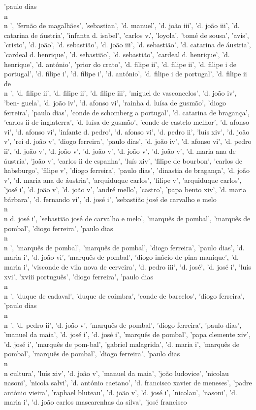 \documentclass{article}
\begin{document}
\begin{itemize}
'paulo dias\\n\\n ', 'fernão de magalhães', 'sebastian', 'd. manuel', 'd. joão iii', 'd. joão iii', 'd. catarina de áustria', 'infanta d. isabel', 'carlos v.', 'loyola', 'tomé de sousa', 'avis', 'cristo', 'd. joão', 'd. sebastião', 'd. joão iii', 'd. sebastião', 'd. catarina de áustria', 'cardeal d. henrique', 'd. sebastião', 'd. sebastião', 'cardeal d. henrique', 'd. henrique', 'd. antónio', 'prior do crato', 'd. filipe ii', 'd. filipe ii', 'd. filipe i de portugal', 'd. filipe i', 'd. filipe i', 'd. antónio', 'd. filipe i de portugal', 'd. filipe ii de\\n ', 'd. filipe ii', 'd. filipe ii', 'd. filipe iii', 'miguel de vasconcelos', 'd. joão iv', 'ben- guela', 'd. joão iv', 'd. afonso vi', 'rainha d. luísa de gusmão', 'diogo ferreira', 'paulo dias', 'conde de schomberg a portugal', 'd. catarina de bragança', 'carlos ii de inglaterra', 'd. luísa de gusmão', 'conde de castelo melhor', 'd. afonso vi', 'd. afonso vi', 'infante d. pedro', 'd. afonso vi', 'd. pedro ii', 'luís xiv', 'd. joão v', 'rei d. joão v', 'diogo ferreira', 'paulo dias', 'd. joão iv', 'd. afonso vi', 'd. pedro ii', 'd. joão v', 'd. joão v', 'd. joão v', 'd. joão v', 'd. joão v', 'd. maria ana de áustria', 'joão v', 'carlos ii de espanha', 'luís xiv', 'filipe de bourbon', 'carlos de habsburgo', 'filipe v', 'diogo ferreira', 'paulo dias', 'dinastia de bragança', 'd. joão v', 'd. maria ana de áustria', 'arquiduque carlos', 'filipe v', 'arquiduque carlos', 'josé i', 'd. joão v', 'd. joão v', 'andré mello', 'castro', 'papa bento xiv', 'd. maria bárbara', 'd. fernando vi', 'd. josé i', 'sebastião josé de carvalho e melo\\n\\n d. josé i', 'sebastião josé de carvalho e melo', 'marquês de pombal', 'marquês de pombal', 'diogo ferreira', 'paulo dias\\n\\n ', 'marquês de pombal', 'marquês de pombal', 'diogo ferreira', 'paulo dias', 'd. maria i', 'd. joão vi', 'marquês de pombal', 'diogo inácio de pina manique', 'd. maria i', 'visconde de vila nova de cerveira', 'd. pedro iii', 'd. josé', 'd. josé i', 'luís xvi', 'xviii português', 'diogo ferreira', 'paulo dias\\n\\n ', 'duque de cadaval', 'duque de coimbra', 'conde de barcelos', 'diogo ferreira', 'paulo dias\\n\\n ', 'd. pedro ii', 'd. joão v', 'marquês de pombal', 'diogo ferreira', 'paulo dias', 'manuel da maia', 'd. josé i', 'd. josé i', 'marquês de pombal', 'papa clemente xiv', 'd. josé i', 'marquês de pom-bal', 'gabriel malagrida', 'd. maria i', 'marquês de pombal', 'marquês de pombal', 'diogo ferreira', 'paulo dias\\n\\n cultura', 'luís xiv', 'd. joão v', 'manuel da maia', 'joão ludovice', 'nicolau nasoni', 'nicola salvi', 'd. antónio caetano', 'd. francisco xavier de meneses', 'padre antónio vieira', 'raphael bluteau', 'd. joão v', 'd. josé i', 'nicolau', 'nasoni', 'd. maria i', 'd. joão carlos mascarenhas da silva', 'josé francisco 
\end{itemize}
\end{document}
